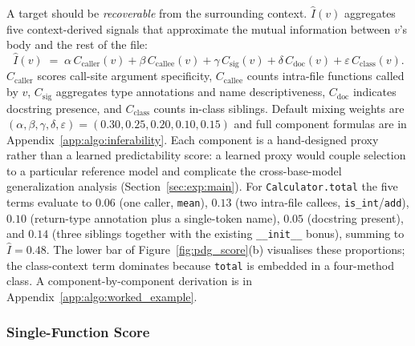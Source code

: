 A target should be \emph{recoverable} from the surrounding context.
$\hat{I}(v)$ aggregates five context-derived signals that approximate the
mutual information between $v$'s body and the rest of the file:
%
\begin{equation}
  \hat{I}(v) \;=\; \alpha\,C_{\mathrm{caller}}(v)
              + \beta\,C_{\mathrm{callee}}(v)
              + \gamma\,C_{\mathrm{sig}}(v)
              + \delta\,C_{\mathrm{doc}}(v)
              + \varepsilon\,C_{\mathrm{class}}(v).
  \label{eq:inferability}
\end{equation}
%
$C_{\mathrm{caller}}$ scores call-site argument specificity,
$C_{\mathrm{callee}}$ counts intra-file functions called by $v$,
$C_{\mathrm{sig}}$ aggregates type annotations and name descriptiveness,
$C_{\mathrm{doc}}$ indicates docstring presence, and
$C_{\mathrm{class}}$ counts in-class siblings. Default mixing weights
are $(\alpha,\beta,\gamma,\delta,\varepsilon)\!=\!(0.30,0.25,0.20,
0.10,0.15)$ and full component formulas are in
Appendix~\ref{app:algo:inferability}. Each component is a hand-designed
proxy rather than a learned predictability score: a learned proxy would
couple selection to a particular reference model and complicate the
cross-base-model generalization analysis (Section~\ref{sec:exp:main}).
For \texttt{Calculator.total} the five terms evaluate to $0.06$ (one
caller, \texttt{mean}), $0.13$ (two intra-file callees,
\texttt{is\_int}/\texttt{add}), $0.10$ (return-type annotation plus a
single-token name), $0.05$ (docstring present), and $0.14$ (three
siblings together with the existing \texttt{\_\_init\_\_} bonus),
summing to $\hat{I}\!=\!0.48$. The lower bar of
Figure~\ref{fig:pdg_score}(b) visualises these proportions; the
class-context term dominates because \texttt{total} is embedded in a
four-method class. A component-by-component derivation is in
Appendix~\ref{app:algo:worked_example}.

\subsubsection{Single-Function Score}
\label{sec:method:single}

